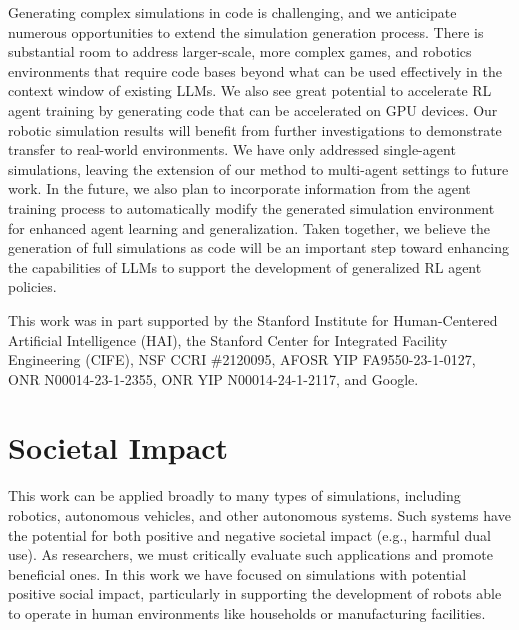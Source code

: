\documentclass{article}
\theoremstyle{plain}
\theoremstyle{definition}
\theoremstyle{remark}
\begin{document}
Generating complex simulations in code is challenging, and we anticipate numerous opportunities to extend the simulation generation process. 
There is substantial room to address larger-scale, more complex games, and robotics environments that require code bases beyond what can be used effectively in the context window of existing LLMs.
We also see great potential to accelerate RL agent training by generating code that can be accelerated on GPU devices. Our robotic simulation results will benefit from further investigations to demonstrate transfer to real-world environments.
We have only addressed single-agent simulations, leaving the extension of our method to multi-agent settings to future work. In the future, we also plan to incorporate information from the agent training process to automatically modify the generated simulation environment for enhanced agent learning and generalization. 
Taken together, we believe the generation of full simulations as code will be an important step toward enhancing the capabilities of LLMs to support the development of generalized RL agent policies.





\begin{ack}
This work was in part supported by the Stanford Institute for Human-Centered Artificial Intelligence (HAI), the Stanford Center for Integrated Facility Engineering (CIFE), NSF CCRI \#2120095, AFOSR YIP FA9550-23-1-0127, ONR N00014-23-1-2355, ONR YIP N00014-24-1-2117, and Google.
\end{ack}

\newpage



\clearpage
\appendix






\section{Societal Impact}
This work can be applied broadly to many types of simulations, including robotics, autonomous vehicles, and other autonomous systems.
Such systems have the potential for both positive and negative societal impact (e.g., harmful dual use).
As researchers, we must critically evaluate such applications and promote beneficial ones.
In this work we have focused on simulations with potential positive social impact, particularly in supporting the development of robots able to operate in human environments like households or manufacturing facilities.
\end{document}
